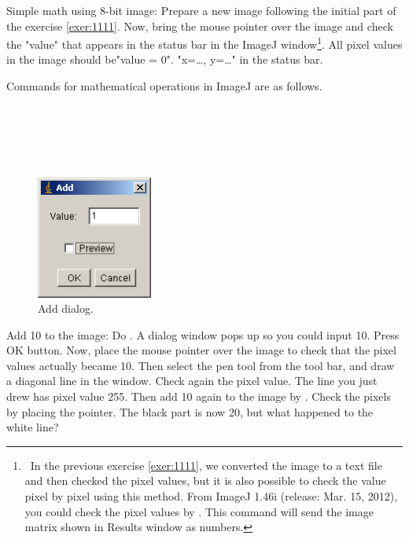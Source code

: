 \begin{indentexercise}{1}
Simple math using 8-bit image: Prepare a new
image following the initial part of the exercise \ref{exer:1111}. Now,
bring the mouse pointer over the image and check the
"value" that appears in the
status bar in the ImageJ window\footnote{\ In the previous exercise \ref{exer:1111}, 
we converted the image to a text file and then checked the pixel
values, but it is also possible to check the value pixel by pixel using
this method. From ImageJ 1.46i (release: Mar. 15, 2012), 
you could check the pixel values by . 
This command will send the image matrix shown in Results window as numbers.}. 
All pixel values in the image should be"value = 0".
"x=\ldots, y=\ldots " in the
status bar. 

Commands for mathematical operations in ImageJ are as follows. 

\\
\\ 
 \\
\\

\begin{figure}[htbp]
\begin{center}
\includegraphics[width=3.8cm]{fig/CMCIBasicCourse201102-img12.png}
\caption{ Add dialog.}
\label{fig:img12}
\end{center}
\end{figure}


Add 10 to the image: Do . A dialog window pops up so you could
input 10. Press OK button. Now, place the mouse pointer over the image
to check that the pixel values actually became 10. Then select the pen
tool from the tool bar, and draw a diagonal line in the window. Check
again the pixel value. The line you just drew has pixel value 255. Then
add 10 again to the image by . Check the pixels by placing the pointer.
The black part is now 20, but what happened to the white line? 


\end{indentexercise}
